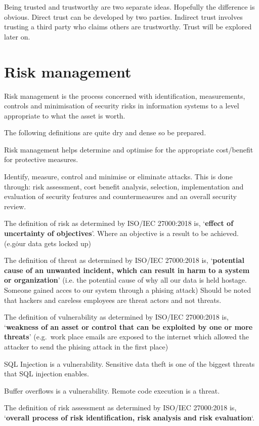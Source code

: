 \documentclass{report}
\begin{document}
Being trusted and trustworthy are two separate ideas.
Hopefully the difference is obvious.
Direct trust can be developed by two parties.
Indirect trust involves trusting a third party who claims others are trustworthy.
Trust will be explored later on.

\section{Risk management}
Risk management is the process concerned with identification, measurements,
controls and minimisation of security risks in information systems to a level
appropriate to what the asset is worth.

The following definitions are quite dry and dense so be prepared.

Risk management helps determine and optimise for the appropriate cost/benefit
for protective measures.

Identify, measure, control and minimise or eliminate attacks.
This is done through: risk assessment, cost benefit analysis, selection,
implementation and evaluation of security features and countermeasures and
an overall security review.

The definition of risk as determined by ISO/IEC 27000:2018 is,
`\textbf{effect of uncertainty of objectives}'.
Where an objective is a result to be achieved. (e.g\. our data gets locked up)

The definition of threat as determined by ISO/IEC 27000:2018 is,
`\textbf{potential cause of an unwanted incident,
which can result in harm to a system
or organization}' (i.e. the potential cause of why all our data is held hostage.
Someone gained acces to our system through a phising attack)
Should be noted that hackers and careless employees are threat actors and not
threats.

The definition of vulnerability as determined by ISO/IEC 27000:2018 is,
`\textbf{weakness of an asset or control that can be exploited by one or more
threats}' (e.g.\ work place emails are exposed to the internet which allowed
the attacker
to send the phising attack in the first place)

SQL Injection is a vulnerability.
Sensitive data theft is one of the biggest threats that SQL injection enables.

Buffer overflows is a vulnerability.
Remote code execution is a threat.

The definition of risk assessment as determined by ISO/IEC 27000:2018 is,
`\textbf{overall process of risk identification, risk analysis and risk
evaluation}`.
\end{document}
